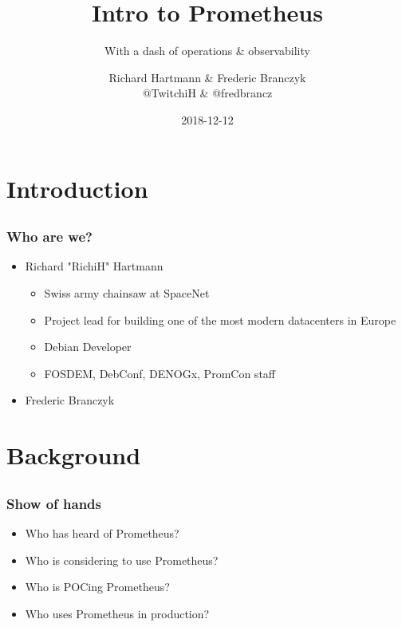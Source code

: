 \documentclass[aspectratio=169]{beamer}
\title{Intro to Prometheus}
\subtitle{With a dash of operations \& observability}
\author{Richard Hartmann \& Frederic Branczyk\\
@TwitchiH \& @fredbrancz}
\date{2018-12-12}
\begin{document}
\section{Introduction}

\subsection{}

\begin{frame}
	\titlepage
\end{frame}

\begin{frame}
	\frametitle{Who are we?}
	\begin{itemize}
		\item Richard "RichiH" Hartmann
		\begin{itemize}
			\item Swiss army chainsaw at SpaceNet
			\item Project lead for building one of the most modern datacenters in Europe
			\item Debian Developer
			\item FOSDEM, DebConf, DENOGx, PromCon staff
		\end{itemize}
		\item Frederic Branczyk
	\end{itemize}
\end{frame}

\subsection{}



\section{Background}


\subsection{}




\begin{frame}
	\frametitle{Show of hands}
	\begin{itemize}
		\item Who has heard of Prometheus?
		\item Who is considering to use Prometheus?
		\item Who is POCing Prometheus?
		\item Who uses Prometheus in production?
	\end{itemize}
\end{frame}
\end{document}

